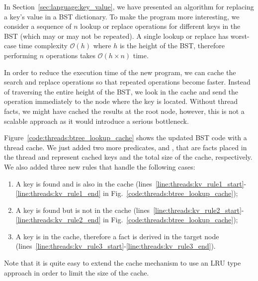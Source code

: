 In Section~\ref{sec:language:key_value}, we have presented an algorithm for
replacing a key's value in a BST dictionary. To make the program more
interesting, we consider a sequence of $n$ lookup or replace operations for
different keys in the BST (which may or may not be repeated). A single lookup or
replace has worst-case time complexity $\mathcal{O}(h)$ where $h$ is the height
of the BST, therefore performing $n$ operations takes $\mathcal{O}(h \times n)$
time.

In order to reduce the execution time of the new program, we can cache the
search and replace operations so that repeated operations become faster. Instead
of traversing the entire height of the BST, we look in the cache and send the
operation immediately to the node where the key is located. Without thread
facts, we might have cached the results at the root node, however, this is not a
scalable approach as it would introduce a serious bottleneck.

Figure~\ref{code:threads:btree_lookup_cache} shows the updated BST code with a thread
cache. We just added two more predicates,  and
, that are facts placed in the thread and represent cached
keys and the total size of the cache, respectively. We also added three new
rules that handle the following cases:

\begin{enumerate}
      \item A key is found and is also in the cache
         (lines~\ref{line:threads:kv_rule1_start}-\ref{line:threads:kv_rule1_end}
         in Fig.~\ref{code:threads:btree_lookup_cache});

      \item A key is found but is not in the cache
         (lines~\ref{line:threads:kv_rule2_start}-\ref{line:threads:kv_rule2_end}
         in Fig.~\ref{code:threads:btree_lookup_cache});

      \item A key is in the cache, therefore a  fact is
         derived in the target node
         (lines~\ref{line:threads:kv_rule3_start}-\ref{line:threads:kv_rule3_end}).

\end{enumerate}

Note that it is quite easy to extend the cache mechanism to use an LRU type
approach in order to limit the size of the cache.

